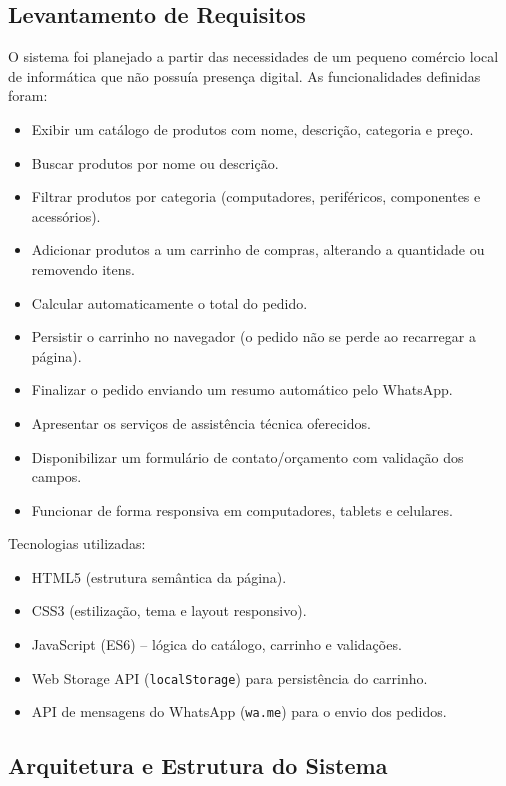 \documentclass[12pt,a4paper]{article}
\begin{document}
\subsection*{Levantamento de Requisitos}

O sistema foi planejado a partir das necessidades de um pequeno comércio local de
informática que não possuía presença digital. As funcionalidades definidas foram:

\begin{itemize}
    \item Exibir um catálogo de produtos com nome, descrição, categoria e preço.
    \item Buscar produtos por nome ou descrição.
    \item Filtrar produtos por categoria (computadores, periféricos, componentes e acessórios).
    \item Adicionar produtos a um carrinho de compras, alterando a quantidade ou removendo itens.
    \item Calcular automaticamente o total do pedido.
    \item Persistir o carrinho no navegador (o pedido não se perde ao recarregar a página).
    \item Finalizar o pedido enviando um resumo automático pelo WhatsApp.
    \item Apresentar os serviços de assistência técnica oferecidos.
    \item Disponibilizar um formulário de contato/orçamento com validação dos campos.
    \item Funcionar de forma responsiva em computadores, tablets e celulares.
\end{itemize}

Tecnologias utilizadas:

\begin{itemize}
    \item HTML5 (estrutura semântica da página).
    \item CSS3 (estilização, tema e layout responsivo).
    \item JavaScript (ES6) -- lógica do catálogo, carrinho e validações.
    \item Web Storage API (\texttt{localStorage}) para persistência do carrinho.
    \item API de mensagens do WhatsApp (\texttt{wa.me}) para o envio dos pedidos.
\end{itemize}

\subsection*{Arquitetura e Estrutura do Sistema}
\end{document}
